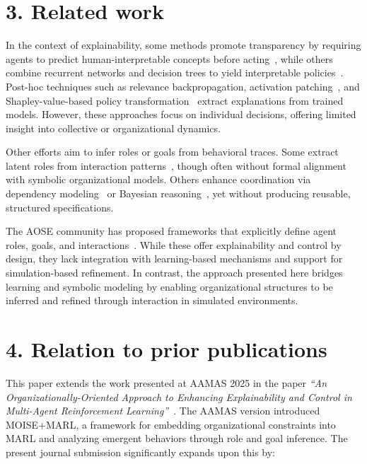 \documentclass[11pt]{article}
\begin{document}
\section*{3. Related work}

In the context of explainability, some methods promote transparency by requiring agents to predict human-interpretable concepts before acting~\citep{zabounidis2023concept}, while others combine recurrent networks and decision trees to yield interpretable policies~\citep{liu2025}. Post-hoc techniques such as relevance backpropagation, activation patching~\citep{poupart2025perspectives}, and Shapley-value-based policy transformation~\citep{li2025from} extract explanations from trained models. However, these approaches focus on individual decisions, offering limited insight into collective or organizational dynamics.

Other efforts aim to infer roles or goals from behavioral traces. Some extract latent roles from interaction patterns~\citep{serrino2019finding}, though often without formal alignment with symbolic organizational models. Others enhance coordination via dependency modeling~\citep{berenji2000learning} or Bayesian reasoning~\citep{yusuf2020inferential}, yet without producing reusable, structured specifications.

The AOSE community has proposed frameworks that explicitly define agent roles, goals, and interactions~\citep{gaia1998,Castro2002,Pavon2003}. While these offer explainability and control by design, they lack integration with learning-based mechanisms and support for simulation-based refinement.
%
In contrast, the approach presented here bridges learning and symbolic modeling by enabling organizational structures to be inferred and refined through interaction in simulated environments.


\section*{4. Relation to prior publications}

This paper extends the work presented at AAMAS 2025 in the paper \textit{“An Organizationally-Oriented Approach to Enhancing Explainability and Control in Multi-Agent Reinforcement Learning”}~\citep{soule2025moisemarl}. The AAMAS version introduced MOISE+MARL, a framework for embedding organizational constraints into MARL and analyzing emergent behaviors through role and goal inference. The present journal submission significantly expands upon this by:
\end{document}
